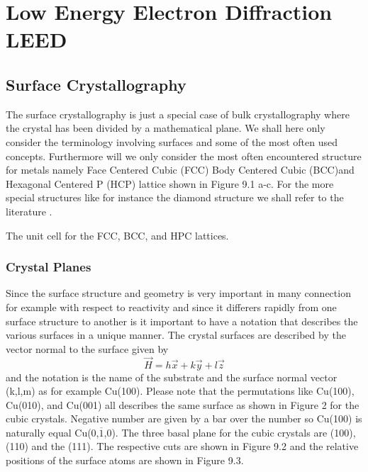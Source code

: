 \newpage
\chapter{Low Energy Electron Diffraction LEED}
\section{Surface Crystallography}
The surface crystallography is just a special case of bulk crystallography where the crystal has been divided by a mathematical plane. We shall here only consider the terminology involving surfaces and some of the most often used concepts. Furthermore will we only consider the most often encountered structure for metals namely Face Centered Cubic (FCC) Body Centered Cubic (BCC)and Hexagonal Centered P (HCP) lattice shown in Figure 9.1 a-c.  For the more special structures like for instance the diamond structure we shall refer to the literature \cite{Kittel, Ashcroft}.

\vspace*{9cm}

 The unit cell for the FCC, BCC, and HPC lattices.

\vspace{1cm}
 

\subsection{Crystal Planes}
Since the surface structure and geometry is very important in many connection for example with respect to reactivity and since it differers rapidly from one surface structure to another is it important to have a notation that describes the various surfaces in a unique manner.
The crystal surfaces are described by the vector normal to the surface given by 
\begin{equation}
 \overrightarrow{H} = h\overrightarrow{x} + k\overrightarrow{y} + l\overrightarrow{z}
\end{equation}
and the  notation is the name of the substrate and the surface normal vector (k,l,m) as for example Cu(100). Please note that the permutations like  Cu(100), Cu(010), and Cu(001) all describes the same surface as shown in Figure 2 for the cubic crystals. Negative number are given by a bar over the number so Cu(100) is naturally equal Cu(0,$\overline{1}$,0). The three basal plane for the cubic crystals are (100), (110) and the (111). The respective cuts are shown in Figure 9.2 and the relative positions of the surface atoms are shown in Figure 9.3.

